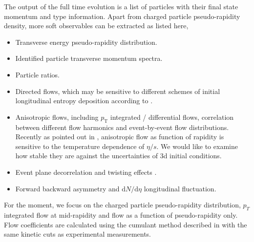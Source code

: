 \documentclass[aps,prl,twocolumn,groupedaddress]{revtex4-1}
\begin{document}
	The output of the full time evolution is a list of particles with their final state momentum and type information.
	Apart from charged particle pseudo-rapidity density, more soft observables can be extracted as listed here,
	\begin{itemize}
	\item Transverse energy pseudo-rapidity distribution.
	\item Identified particle transverse momentum spectra.
	\item Particle ratios.
	\item Directed flows, which may be sensitive to different schemes of initial longitudinal entropy deposition according to \citep{Bozek:2009ty}.
	\item Anisotropic flows, including $p_\textrm{T}$ integrated / differential flows, correlation between different flow harmonics and event-by-event flow distributions. Recently as pointed out in \citep{Denicol:2015bnf}, anisotropic flow as function of rapidity is sensitive to the temperature dependence of $\eta/s$. We would like to examine how stable they are against the uncertainties of 3d initial conditions.
	\item Event plane decorrelation and twisting effects \citep{CMS:2015oea}.
	\item Forward backward asymmetry and $\mathrm{d}N /\mathrm{d}\eta$ longitudinal fluctuation.
	\end{itemize}
	
	For the moment, we focus on the charged particle pseudo-rapidity distribution, $p_T$ integrated flow at mid-rapidity and flow as a function of pseudo-rapidity only. 
	Flow coefficients are calculated using the cumulant method described in \citep{Bilandzic:2010jr} with the same kinetic cuts as experimental measurements.
	
\end{document}
